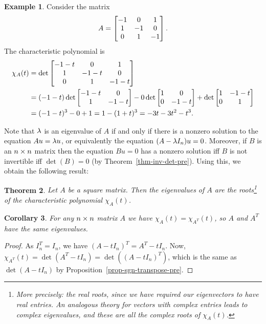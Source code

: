 \documentclass[reqno]{amsart}
\newtheorem{theorem}{Theorem}[section]
\newtheorem{corollary}[theorem]{Corollary}
\theoremstyle{definition}
\newtheorem{example}[theorem]{Example}
\begin{document}
\begin{example}\label{eg-chi-three}
 Consider the matrix
 \[ A = \left[\begin{matrix} -1 & 0 & 1 \\ 1 & -1 & 0 \\ 0 & 1 & -1 \end{matrix}\right]. \]
 The characteristic polynomial is
 \begin{align*}
  \chi_A(t) &=
   \det \left[\begin{matrix} -1-t & 0 & 1 \\ 1 & -1-t & 0 \\ 0 & 1 & -1-t \end{matrix}\right] \\
   &= (-1-t) \det \left[\begin{matrix} -1-t & 0 \\ 1 & -1-t \end{matrix}\right]
      - 0 \det \left[\begin{matrix} 1 & 0 \\ 0 & -1-t \end{matrix}\right]
      + \det \left[\begin{matrix} 1 & -1-t \\ 0 & 1 \end{matrix}\right] \\
   &= (-1-t)^3  - 0 + 1 = 1-(1+t)^3
    = -3t-3t^2-t^3.
 \end{align*}
\end{example}

Note that $\lambda$ is an eigenvalue of $A$ if and only if there is a
nonzero solution to the equation $Au=\lambda u$, or equivalently the
equation $(A-\lambda I_n)u=0$.  Moreover, if $B$ is an $n\times n$ matrix
then the equation $Bu=0$ has a nonzero solution iff $B$ is
not invertible iff $\det(B)=0$ (by Theorem~\ref{thm-inv-det-pre}).
Using this, we obtain the following result:
\begin{theorem}\label{thm-chi-roots}
 Let $A$ be a square matrix.  Then the eigenvalues of $A$ are the
 roots\footnote{More precisely: the real roots, since we have
 required our eigenvectors to have real entries. An analogous
 theory for vectors with complex entries leads to complex
 eigenvalues, and these are all the complex roots of $\chi_A(t)$.}
 of the characteristic polynomial $\chi_A(t)$.
\end{theorem}

\begin{corollary}\label{cor-eigen-transpose}
 For any $n\times n$ matrix $A$ we have $\chi_A(t)=\chi_{A^T}(t)$, so $A$
 and $A^T$ have the same eigenvalues.
\end{corollary}
\begin{proof}
 As $I_n^T=I_n$, we have
 $(A-tI_n)^T = A^T-tI_n$.
 Now,
 $\chi_{A^T}(t)=\det(A^T-tI_n)=\det((A-tI_n)^T)$, which is the same as
 $\det(A-tI_n)$ by Proposition~\ref{prop-sgn-transpose-pre}.
\end{proof}
\end{document}
